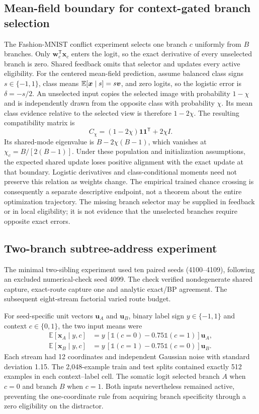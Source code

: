 \subsection{Mean-field boundary for context-gated branch selection}

The Fashion-MNIST conflict experiment selects one branch $c$ uniformly from
$B$ branches. Only $\bm w_c^{\mathsf T}\bm x_c$ enters the logit, so the
exact derivative of every unselected branch is zero. Shared feedback omits
that selector and updates every active eligibility. For the centered
mean-field prediction, assume balanced class signs $s\in\{-1,1\}$,
class means $\mathbb{E}[\bm x\mid s]=s\bm v$, and zero logits, so the logistic
error is $\delta=-s/2$. An unselected input copies the selected image with
probability $1-\chi$ and is independently drawn from the opposite class
with probability $\chi$. Its mean class evidence relative to the selected
view is therefore $1-2\chi$. The resulting compatibility matrix is
\[
C_\chi=(1-2\chi)\bm 1\bm 1^{\mathsf T}+2\chi I.
\]
Its shared-mode eigenvalue is $B-2\chi(B-1)$, which vanishes at
$\chi_c=B/[2(B-1)]$. Under these population and initialization assumptions,
the expected shared update loses positive alignment with the exact update
at that boundary. Logistic derivatives and class-conditional moments need
not preserve this relation as weights change. The empirical trained
chance crossing is consequently a separate descriptive endpoint, not a
theorem about the entire optimization trajectory. The missing branch
selector may be supplied in feedback or in local eligibility; it is not
evidence that the unselected branches require opposite exact errors.

\subsection{Two-branch subtree-address experiment}

The minimal two-sibling experiment used ten paired seeds (4100--4109), following an excluded numerical-check seed 4099. The check verified nondegenerate shared capture, exact-route capture one and analytic exact/BP agreement. The subsequent eight-stream factorial varied route budget.

For seed-specific unit vectors $\bm u_A$ and $\bm u_B$, binary label sign
$y\in\{-1,1\}$ and context $c\in\{0,1\}$, the two input means were
\begin{align}
\mathbb E[\bm x_A\mid y,c]
&=y\,[\mathbb 1(c=0)-0.75\mathbb 1(c=1)]\bm u_A,\\
\mathbb E[\bm x_B\mid y,c]
&=y\,[\mathbb 1(c=1)-0.75\mathbb 1(c=0)]\bm u_B.
\label{eq:s_credit_reversal_task}
\end{align}
Each stream had 12 coordinates and independent Gaussian noise with standard
deviation 1.15. The 2,048-example train and test splits contained exactly 512
examples in each context--label cell. The somatic logit selected branch $A$
when $c=0$ and branch $B$ when $c=1$. Both inputs nevertheless remained
active, preventing the one-coordinate rule from acquiring branch specificity
through a zero eligibility on the distractor.

